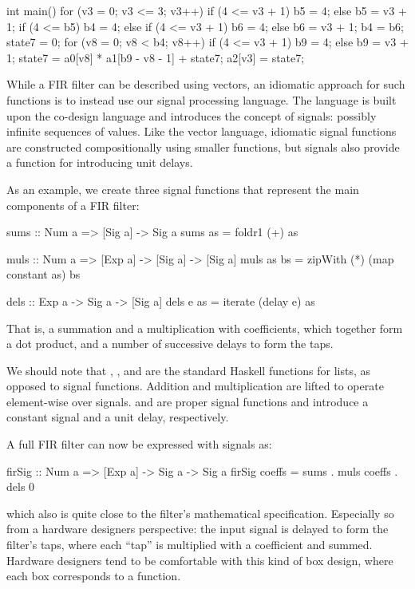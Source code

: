 \documentclass[../paper.tex]{subfiles}
\begin{document}
\begin{code}
int main() {
  for (v3 = 0; v3 <= 3; v3++) {
    if (4 <= v3 + 1) { b5 = 4; } else { b5 = v3 + 1; }
    if (4 <= b5) { b4 = 4; }
    else {
      if (4 <= v3 + 1) { b6 = 4; } else { b6 = v3 + 1; }
      b4 = b6;
    }
    state7 = 0;
    for (v8 = 0; v8 < b4; v8++) {
      if (4 <= v3 + 1) { b9 = 4; } else { b9 = v3 + 1; }
      state7 = a0[v8] * a1[b9 - v8 - 1] + state7;
    }
    a2[v3] = state7;
  }
}
\end{code}

While a FIR filter can be described using vectors, an idiomatic approach for such functions is to instead use our signal processing language. The language is built upon the co-design language and introduces the concept of signals: possibly infinite sequences of values. Like the vector language, idiomatic signal functions are constructed compositionally using smaller functions, but signals also provide a function for introducing unit delays.

As an example, we create three signal functions that represent the main components of a FIR filter:

\begin{code}
sums :: Num a => [Sig a] -> Sig a
sums as = foldr1 (+) as

muls :: Num a => [Exp a] -> [Sig a] -> [Sig a]
muls as bs = zipWith (*) (map constant as) bs

dels :: Exp a -> Sig a -> [Sig a]
dels e as = iterate (delay e) as
\end{code}

\noindent That is, a summation and a multiplication with coefficients, which together form a dot product, and a number of successive delays to form the taps.

We should note that , ,  and  are the standard Haskell functions for lists, as opposed to signal functions. Addition and multiplication are lifted to operate element-wise over signals.  and  are proper signal functions and introduce a constant signal and a unit delay, respectively.

A full FIR filter can now be expressed with signals as:

\begin{code}
firSig :: Num a => [Exp a] -> Sig a -> Sig a
firSig coeffs = sums . muls coeffs . dels 0
\end{code}

\noindent which also is quite close to the filter's mathematical specification. Especially so from a hardware designers perspective: the input signal is delayed to form the filter's taps, where each ``tap'' is multiplied with a coefficient and summed. Hardware designers tend to be comfortable with this kind of box design, where each box corresponds to a function.
\end{document}
